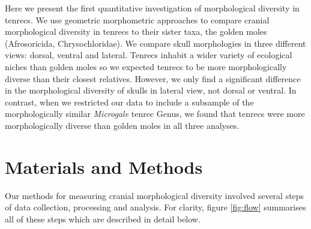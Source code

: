 \documentclass[12pt,a4paper]{article}
\begin{document}
	Here we present the first quantitative investigation of morphological diversity in tenrecs. We use geometric morphometric approaches to compare cranial morphological diversity in tenrecs to their sister taxa, the golden moles (Afrosoricida, Chrysochloridae). We compare skull morphologies in three different views: dorsal, ventral and lateral. 
	Tenrecs inhabit a wider variety of ecological niches \citep{Soarimalala2011} than golden moles \citep{Bronner1995} so we expected tenrecs to be more morphologically diverse than their closest relatives. However, we only find a significant difference in the morphological diversity of skulls in lateral view, not dorsal or ventral. In contrast, when we restricted our data to include a subsample of the morphologically similar \textit{Microgale} tenrec Genus, we found that tenrecs were more morphologically diverse than golden moles in all three analyses.
	
	

\section{Materials and Methods}

	Our methods for measuring cranial morphological diversity involved several steps of data collection, processing and analysis. For clarity,  figure \ref{fig:flow} summarises all of these steps which are described in detail below.   
	
\end{document}

